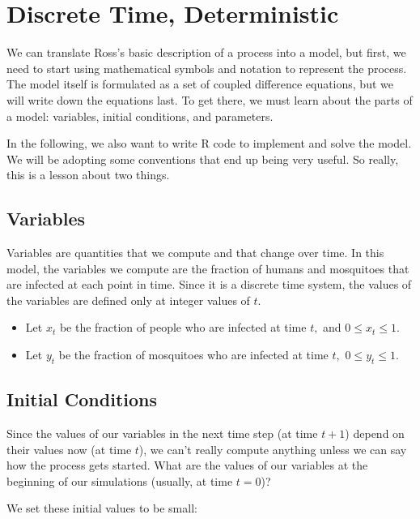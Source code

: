 \documentclass[
]{book}
\begin{document}
\section{Discrete Time, Deterministic}\label{discrete-time-deterministic}

We can translate Ross's basic description of a process into a model, but first, we need to start using mathematical symbols and notation to represent the process. The model itself is formulated as a set of coupled difference equations, but we will write down the equations last. To get there, we must learn about the parts of a model: variables, initial conditions, and parameters.

In the following, we also want to write R code to implement and solve the model. We will be adopting some conventions that end up being very useful. So really, this is a lesson about two things.

\subsection{Variables}\label{variables}

Variables are quantities that we compute and that change over time. In this model, the variables we compute are the fraction of humans and mosquitoes that are infected at each point in time. Since it is a discrete time system, the values of the variables are defined only at integer values of \(t.\)

\begin{itemize}
\item
  Let \(x_t\) be the fraction of people who are infected at time \(t,\) and \(0 \leq x_t \leq 1.\)
\item
  Let \(y_t\) be the fraction of mosquitoes who are infected at time \(t,\) \(0 \leq y_t \leq 1.\)
\end{itemize}

\subsection{Initial Conditions}\label{initial-conditions}

Since the values of our variables in the next time step (at time \(t+1\)) depend on their values now (at time \(t\)), we can't really compute anything unless we can say how the process gets started. What are the values of our variables at the beginning of our simulations (usually, at time \(t=0\))?

We set these initial values to be small:
\end{document}
